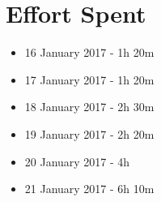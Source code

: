 \section{Effort Spent}

\begin{itemize}
	\item 16 January 2017 - 1h 20m
	\item 17 January 2017 - 1h 20m
	\item 18 January 2017 - 2h 30m
	\item 19 January 2017 - 2h 20m
	\item 20 January 2017 - 4h
	\item 21 January 2017 - 6h 10m
\end{itemize}
